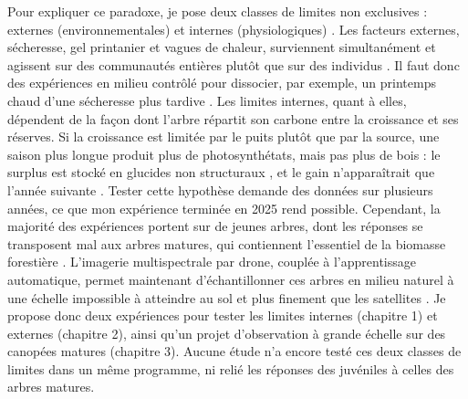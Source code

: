 \documentclass[12pt]{article}
\begin{document}
Pour expliquer ce paradoxe, je pose deux classes de limites non exclusives : externes (environnementales) et internes (physiologiques) \cite{wolkovich_why_2025}. Les facteurs externes, sécheresse, gel printanier et vagues de chaleur, surviennent simultanément et agissent sur des communautés entières plutôt que sur des individus \cite{li_widespread_2023}. Il faut donc des expériences en milieu contrôlé pour dissocier, par exemple, un printemps chaud d'une sécheresse plus tardive \cite{primack_observations_2015}. Les limites internes, quant à elles, dépendent de la façon dont l'arbre répartit son carbone entre la croissance et ses réserves. Si la croissance est limitée par le puits plutôt que par la source, une saison plus longue produit plus de photosynthétats, mais pas plus de bois : le surplus est stocké en glucides non structuraux \cite{zohner_effect_2023,chapin_ecology_1990}, et le gain n'apparaîtrait que l'année suivante \cite{landhausser_partitioning_2012}. Tester cette hypothèse demande des données sur plusieurs années, ce que mon expérience terminée en 2025 rend possible. Cependant, la majorité des expériences portent sur de jeunes arbres, dont les réponses se transposent mal aux arbres matures, qui contiennent l'essentiel de la biomasse forestière \cite{vitasse_ontogenic_2013}. L'imagerie multispectrale par drone, couplée à l'apprentissage automatique, permet maintenant d'échantillonner ces arbres en milieu naturel à une échelle impossible à atteindre au sol et plus finement que les satellites \cite{teng_bringing_2025}. Je propose donc deux expériences pour tester les limites internes (chapitre 1) et externes (chapitre 2), ainsi qu'un projet d'observation à grande échelle sur des canopées matures (chapitre 3). Aucune étude n'a encore testé ces deux classes de limites dans un même programme, ni relié les réponses des juvéniles à celles des arbres matures. \\
\end{document}

